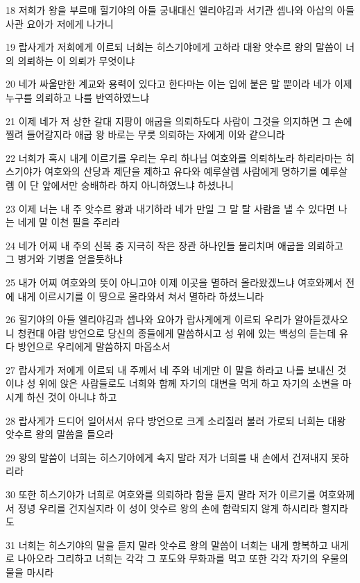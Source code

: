 \par 18 저희가 왕을 부르매 힐기야의 아들 궁내대신 엘리야김과 서기관 셉나와 아삽의 아들 사관 요아가 저에게 나가니
\par 19 랍사게가 저희에게 이르되 너희는 히스기야에게 고하라 대왕 앗수르 왕의 말씀이 너의 의뢰하는 이 의뢰가 무엇이냐
\par 20 네가 싸울만한 계교와 용력이 있다고 한다마는 이는 입에 붙은 말 뿐이라 네가 이제 누구를 의뢰하고 나를 반역하였느냐
\par 21 이제 네가 저 상한 갈대 지팡이 애굽을 의뢰하도다 사람이 그것을 의지하면 그 손에 찔려 들어갈지라 애굽 왕 바로는 무릇 의뢰하는 자에게 이와 같으니라
\par 22 너희가 혹시 내게 이르기를 우리는 우리 하나님 여호와를 의뢰하노라 하리라마는 히스기야가 여호와의 산당과 제단을 제하고 유다와 예루살렘 사람에게 명하기를 예루살렘 이 단 앞에서만 숭배하라 하지 아니하였느냐 하셨나니
\par 23 이제 너는 내 주 앗수르 왕과 내기하라 네가 만일 그 말 탈 사람을 낼 수 있다면 나는 네게 말 이천 필을 주리라
\par 24 네가 어찌 내 주의 신복 중 지극히 작은 장관 하나인들 물리치며 애굽을 의뢰하고 그 병거와 기병을 얻을듯하냐
\par 25 내가 어찌 여호와의 뜻이 아니고야 이제 이곳을 멸하러 올라왔겠느냐 여호와께서 전에 내게 이르시기를 이 땅으로 올라와서 쳐서 멸하라 하셨느니라
\par 26 힐기야의 아들 엘리야김과 셉나와 요아가 랍사게에게 이르되 우리가 알아듣겠사오니 청컨대 아람 방언으로 당신의 종들에게 말씀하시고 성 위에 있는 백성의 듣는데 유다 방언으로 우리에게 말씀하지 마옵소서
\par 27 랍사게가 저에게 이르되 내 주께서 네 주와 네게만 이 말을 하라고 나를 보내신 것이냐 성 위에 앉은 사람들로도 너희와 함께 자기의 대변을 먹게 하고 자기의 소변을 마시게 하신 것이 아니냐 하고
\par 28 랍사게가 드디어 일어서서 유다 방언으로 크게 소리질러 불러 가로되 너희는 대왕 앗수르 왕의 말씀을 들으라
\par 29 왕의 말씀이 너희는 히스기야에게 속지 말라 저가 너희를 내 손에서 건져내지 못하리라
\par 30 또한 히스기야가 너희로 여호와를 의뢰하라 함을 듣지 말라 저가 이르기를 여호와께서 정녕 우리를 건지실지라 이 성이 앗수르 왕의 손에 함락되지 않게 하시리라 할지라도
\par 31 너희는 히스기야의 말을 듣지 말라 앗수르 왕의 말씀이 너희는 내게 항복하고 내게로 나아오라 그리하고 너희는 각각 그 포도와 무화과를 먹고 또한 각각 자기의 우물의 물을 마시라
